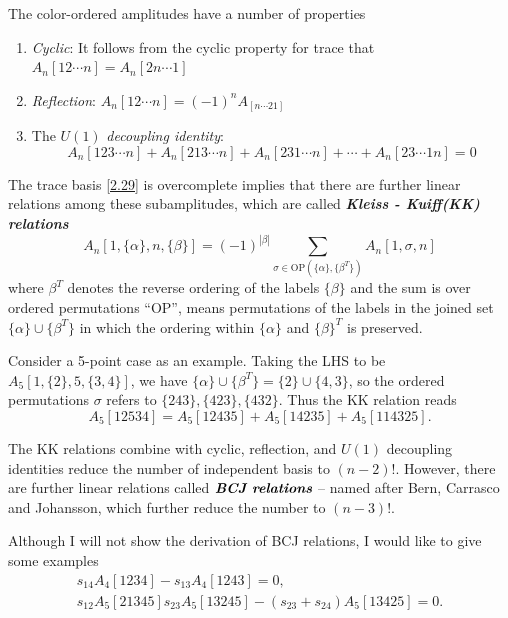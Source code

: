 \documentclass[12pt]{article}
\numberwithin{equation}{section}
\begin{document}
The color-ordered amplitudes have a number of properties
\begin{enumerate}
    \item \textit{Cyclic}: It follows from the cyclic property for trace that $A_n[12\cdots n]=A_n[2n\cdots 1]$
    \item \textit{Reflection}: $A_n[12\cdots n]=(-1)^nA_[n\cdots 21]$
    \item The $U(1)$ \textit{decoupling identity}: 
    \begin{equation}
        A_n[123\cdots n]+A_n[213\cdots n]+A_n[231\cdots n]+\cdots + A_n[23\cdots 1n]=0
    \end{equation}
\end{enumerate}

The trace basis \eqref{2.29} is overcomplete implies that there are further linear relations among these subamplitudes, which are called 
\textit{\textbf{Kleiss - Kuiff(KK) relations}} 
\begin{equation}
    A_n[1,\{\alpha\},n,\{\beta\}]=(-1)^{|\beta|}\sum_{\sigma\in \text{OP}(\{\alpha\},\{\beta^T\}) }A_n[1,\sigma,n]
\end{equation}
where $\beta^T$ denotes the reverse ordering of the labels $\{\beta\}$  and the sum is over ordered
permutations “OP”, means permutations of the labels in the joined set $\{\alpha\}\cup \{\beta^T\}$ in which 
the ordering within $\{\alpha\}$ and $\{\beta\}^T$ is preserved. 

Consider a 5-point case as an example. Taking the LHS to be $A_5[1,\{2\},5,\{3,4\}]$, we have $\{\alpha\}\cup \{\beta^T\}=\{2\}\cup \{4,3\}$, so the 
ordered permutations $\sigma$ refers to $\{243\},\{423\},\{432\}$. Thus the KK relation reads
\begin{equation}
    A_5[12534]=A_5[12435]+A_5[14235]+A_5[114325].
\end{equation}

The KK relations combine with cyclic, reflection, and $U(1)$ decoupling identities reduce the number of independent
basis to $(n-2)!$. However, there are further linear relations called $\textit{\textbf{BCJ relations}}$ -- named after Bern, Carrasco and Johansson, which further
reduce the number to $(n-3)!$. 

Although I will not show the derivation of BCJ relations, I would like to give some examples
\begin{gather}
    s_{14}A_4[1234]-s_{13}A_4[1243]=0,\\
    s_{12}A_5[21345]s_{23}A_5[13245]-(s_{23}+s_{24})A_5[13425]=0.
\end{gather}
\end{document}
